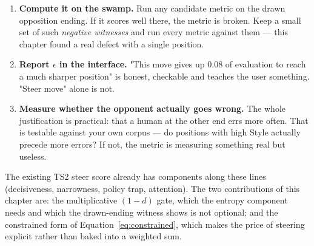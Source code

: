 \begin{enumerate}
\item \textbf{Compute it on the swamp.} Run any candidate metric on the drawn opposition
  ending. If it scores well there, the metric is broken. Keep a small set of such
  \emph{negative witnesses} and run every metric against them --- this chapter found a real
  defect with a single position.
\item \textbf{Report $\epsilon$ in the interface.} "This move gives up $0.08$ of evaluation to
  reach a much sharper position" is honest, checkable and teaches the user something. "Steer
  move" alone is not.
\item \textbf{Measure whether the opponent actually goes wrong.} The whole justification is
  practical: that a human at the other end errs more often. That is testable against your own
  corpus --- do positions with high $\text{Style}$ actually precede more errors? If not, the
  metric is measuring something real but useless.
\end{enumerate}

\begin{repobox}[title={in this repository}]
The existing TS2 steer score already has components along these lines (decisiveness,
narrowness, policy trap, attention). The two contributions of this chapter are: the
multiplicative $(1-d)$ gate, which the entropy component needs and which the drawn-ending
witness shows is not optional; and the constrained form of Equation~\eqref{eq:constrained},
which makes the price of steering explicit rather than baked into a weighted sum.
\end{repobox}

